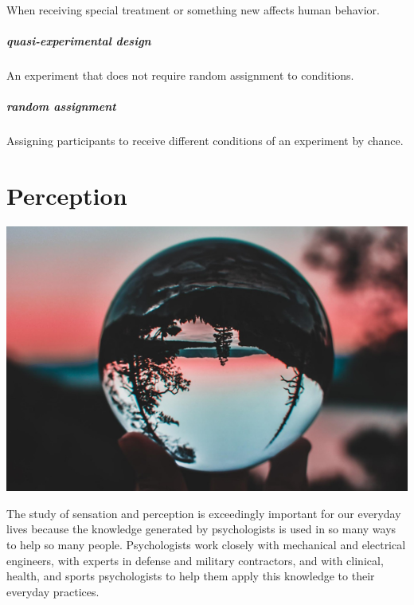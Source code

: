 \documentclass[
]{krantz}
\begin{document}
When receiving special treatment or something new affects human behavior.

\hypertarget{quasi-experimental-design}{%
\paragraph*{quasi-experimental design}\label{quasi-experimental-design}}

An experiment that does not require random assignment to conditions.

\hypertarget{random-assignment}{%
\paragraph*{random assignment}\label{random-assignment}}

Assigning participants to receive different conditions of an experiment by chance.

\hypertarget{perception}{%
\chapter{Perception}\label{perception}}

\begin{center}\includegraphics[width=1\linewidth]{images/ch2/intro} \end{center}

The study of sensation and perception is exceedingly important for our everyday lives because the knowledge generated by psychologists is used in so many ways to help so many people. Psychologists work closely with mechanical and electrical engineers, with experts in defense and military contractors, and with clinical, health, and sports psychologists to help them apply this knowledge to their everyday practices.
\end{document}
